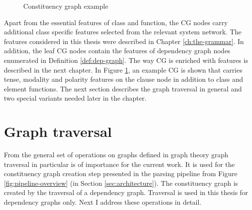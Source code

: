     \begin{figure}[!ht]
    \centering
    \caption{Constituency graph example}
    \label{fig:cg-graph}
    \end{figure}

    Apart from the essential features of class and function, the CG nodes carry additional class specific features selected from the relevant system network. The features considered in this thesis were described in Chapter \ref{ch:the-grammar}. In addition, the leaf CG nodes contain the features of dependency graph nodes enumerated in Definition \ref{def:dep-graph}. The way CG is enriched with features is described in the next chapter. In Figure \ref{fig:cg-graph}, an example CG is shown that carries tense, modality and polarity features on the clause node in addition to class and element functions. The next section describes the graph traversal in general and two special variants needed later in the chapter. 

\section{Graph traversal}
    From the general set of operations on graphs defined in graph theory \citep{bondy1976graph, west2001graph} graph traversal in particular is of importance for the current work. It is used for the constituency graph creation step presented in the parsing pipeline from Figure \ref{fig:pipeline-overview} (in Section \ref{sec:architecture}). The constituency graph is created by the traversal of a dependency graph. Traversal is used in this thesis for dependency graphs only.  Next I address these operations in detail.

